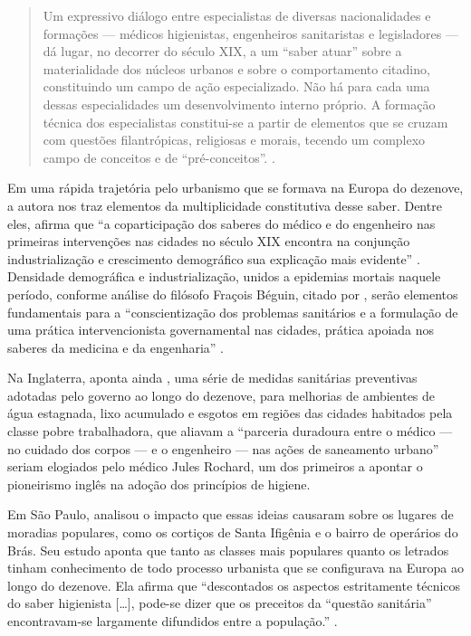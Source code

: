 \begin{refsection}
    \begin{quotation}
        Um expressivo diálogo entre especialistas de diversas nacionalidades e formações --- médicos higienistas, engenheiros sanitaristas e legisladores --- dá lugar, no decorrer do século XIX, a um ``saber atuar'' sobre a materialidade dos núcleos urbanos e sobre o comportamento citadino, constituindo um campo de ação especializado. Não há para cada uma dessas especialidades um desenvolvimento interno próprio. A formação técnica dos especialistas constitui-se a partir de elementos que se cruzam com questões filantrópicas, religiosas e morais, tecendo um complexo campo de conceitos e de ``pré-conceitos''. \cite[p.~28]{Bresciani2010Sanitarismo}. 
    \end{quotation}

    Em uma rápida trajetória pelo urbanismo que se formava na Europa do dezenove, a autora nos traz elementos da multiplicidade constitutiva desse saber. Dentre eles, afirma que ``a coparticipação dos saberes do médico e do engenheiro nas primeiras intervenções nas cidades no século XIX encontra na conjunção industrialização e crescimento demográfico sua explicação mais evidente'' \cite[p.~28]{Bresciani2010Sanitarismo}. Densidade demográfica e industrialização, unidos a epidemias mortais naquele período, conforme análise do filósofo Fraçois Béguin, citado por \textcite{Bresciani2010Sanitarismo}, serão elementos fundamentais para a ``conscientização dos problemas sanitários e a formulação de uma prática intervencionista governamental nas cidades, prática apoiada nos saberes da medicina e da engenharia'' \cite[p.~28]{Bresciani2010Sanitarismo}.  

    Na Inglaterra, aponta ainda \textcite{Bresciani2010Sanitarismo}, uma série de medidas sanitárias preventivas adotadas pelo governo ao longo do dezenove, para melhorias de ambientes de água estagnada, lixo acumulado e esgotos em regiões das cidades habitados pela classe pobre trabalhadora, que aliavam a ``parceria duradoura entre o médico --- no cuidado dos corpos --- e o engenheiro --- nas ações de saneamento urbano'' \cite[p.~29]{Bresciani2010Sanitarismo} seriam elogiados pelo médico Jules Rochard, um dos primeiros a apontar o pioneirismo inglês na adoção dos princípios de higiene. 

    Em São Paulo, \textcite{Bresciani2010Sanitarismo} analisou o impacto que essas ideias causaram sobre os lugares de moradias populares, como os cortiços de Santa Ifigênia e o bairro de operários do Brás. Seu estudo aponta que tanto as classes mais populares quanto os letrados tinham conhecimento de todo processo urbanista que se configurava na Europa ao longo do dezenove. Ela afirma que ``descontados os aspectos estritamente técnicos do saber higienista [\dots], pode-se dizer que os preceitos da ``questão sanitária'' encontravam-se largamente difundidos entre a população.'' \cite[p.~19]{Bresciani2010Sanitarismo}. 


\end{refsection}
